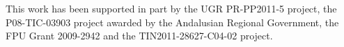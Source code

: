 \documentclass[prodmode,acmtecs]{acmsmall}
\begin{document}

\begin{acks}
This work has been supported in part by 
the UGR PR-PP2011-5 project, 
the P08-TIC-03903 project awarded by the Andalusian Regional Government, 
the FPU Grant 2009-2942 
and 
the TIN2011-28627-C04-02 project.

\end{acks}


 


\bigskip


\end{document}
